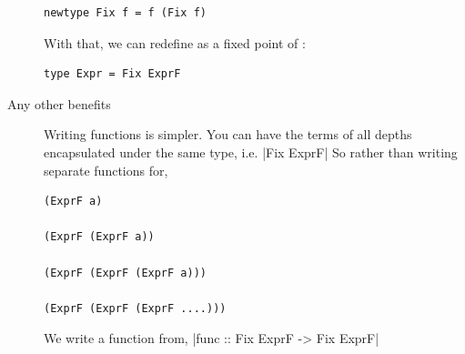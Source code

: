 \documentclass[thesis-solanki.tex]{subfiles}
\begin{document}
\begin{description}
\begin{verbatim}
newtype Fix f = f (Fix f)
\end{verbatim}
With that, we can redefine  as a fixed point of :
\begin{verbatim}
type Expr = Fix ExprF
\end{verbatim}

\item[Any other benefits]
Writing functions is simpler. You can have the terms of all depths encapsulated under the same type, i.e.
|Fix ExprF|
So rather than writing separate functions for,
\begin{verbatim}
(ExprF a)

(ExprF (ExprF a))

(ExprF (ExprF (ExprF a)))

(ExprF (ExprF (ExprF ....)))
\end{verbatim}

We write a function from,
|func :: Fix ExprF -> Fix ExprF|

\end{description}
\end{document}
